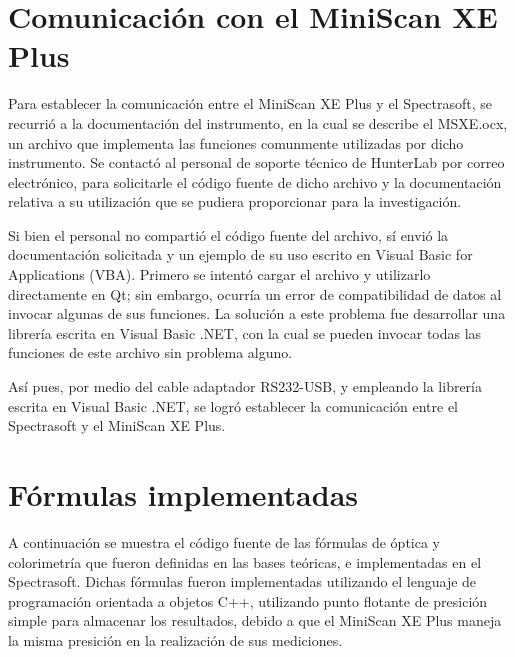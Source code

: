 \newpage
\section{Comunicaci\'{o}n con el MiniScan XE Plus}

	Para establecer la comunicaci\'{o}n entre el MiniScan XE Plus y el Spectrasoft, se recurri\'{o} a la documentaci\'{o}n del instrumento, en la cual se describe el MSXE.ocx, un archivo que implementa las funciones comunmente utilizadas por dicho instrumento. Se contact\'{o} al personal de soporte t\'{e}cnico de HunterLab por correo electr\'{o}nico, para solicitarle el c\'{o}digo fuente de dicho archivo y la documentaci\'{o}n relativa a su utilizaci\'{o}n que se pudiera proporcionar para la investigaci\'{o}n.
	
	Si bien el personal no comparti\'{o} el c\'{o}digo fuente del archivo, s\'{i} envi\'{o} la documentaci\'{o}n solicitada y un ejemplo de su uso escrito en Visual Basic for Applications (VBA). Primero se intent\'{o} cargar el archivo y utilizarlo directamente en Qt; sin embargo, ocurr\'{i}a un error de compatibilidad de datos al invocar algunas de sus funciones. La soluci\'{o}n a este problema fue desarrollar una librer\'{i}a escrita en Visual Basic .NET, con la cual se pueden invocar todas las funciones de este archivo sin problema alguno.

	As\'{i} pues, por medio del cable adaptador RS232-USB, y empleando la librer\'{i}a escrita en Visual Basic .NET, se logr\'{o} establecer la comunicaci\'{o}n entre el Spectrasoft y el MiniScan XE Plus.
\newpage
\section{F\'{o}rmulas implementadas}
	A continuaci\'{o}n se muestra el c\'{o}digo fuente de las f\'{o}rmulas de \'{o}ptica y colorimetr\'{i}a que fueron definidas en las bases te\'{o}ricas, e implementadas en el Spectrasoft. Dichas f\'{o}rmulas fueron implementadas utilizando el lenguaje de programaci\'{o}n orientada a objetos C++, utilizando punto flotante de presici\'{o}n simple para almacenar los resultados, debido a que el MiniScan XE Plus maneja la misma presici\'{o}n en la realizaci\'{o}n de sus mediciones.
	
